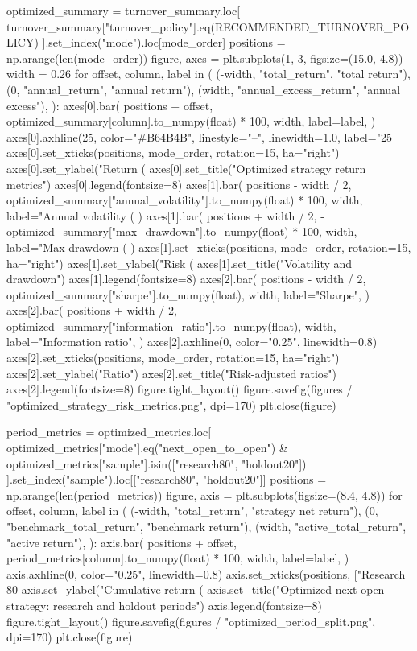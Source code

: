 \documentclass[UTF8,a4paper,fontset=fandol]{ctexart}
\begin{document}
\begin{ProjectCode}
    optimized_summary = turnover_summary.loc[
        turnover_summary["turnover_policy"].eq(RECOMMENDED_TURNOVER_POLICY)
    ].set_index("mode").loc[mode_order]
    positions = np.arange(len(mode_order))
    figure, axes = plt.subplots(1, 3, figsize=(15.0, 4.8))
    width = 0.26
    for offset, column, label in (
        (-width, "total_return", "total return"),
        (0, "annual_return", "annual return"),
        (width, "annual_excess_return", "annual excess"),
    ):
        axes[0].bar(
            positions + offset,
            optimized_summary[column].to_numpy(float) * 100,
            width,
            label=label,
        )
    axes[0].axhline(25, color="#B64B4B", linestyle="--", linewidth=1.0, label="25%
    axes[0].set_xticks(positions, mode_order, rotation=15, ha="right")
    axes[0].set_ylabel("Return (%
    axes[0].set_title("Optimized strategy return metrics")
    axes[0].legend(fontsize=8)
    axes[1].bar(
        positions - width / 2,
        optimized_summary["annual_volatility"].to_numpy(float) * 100,
        width,
        label="Annual volatility (%
    )
    axes[1].bar(
        positions + width / 2,
        -optimized_summary["max_drawdown"].to_numpy(float) * 100,
        width,
        label="Max drawdown (%
    )
    axes[1].set_xticks(positions, mode_order, rotation=15, ha="right")
    axes[1].set_ylabel("Risk (%
    axes[1].set_title("Volatility and drawdown")
    axes[1].legend(fontsize=8)
    axes[2].bar(
        positions - width / 2,
        optimized_summary["sharpe"].to_numpy(float),
        width,
        label="Sharpe",
    )
    axes[2].bar(
        positions + width / 2,
        optimized_summary["information_ratio"].to_numpy(float),
        width,
        label="Information ratio",
    )
    axes[2].axhline(0, color="0.25", linewidth=0.8)
    axes[2].set_xticks(positions, mode_order, rotation=15, ha="right")
    axes[2].set_ylabel("Ratio")
    axes[2].set_title("Risk-adjusted ratios")
    axes[2].legend(fontsize=8)
    figure.tight_layout()
    figure.savefig(figures / "optimized_strategy_risk_metrics.png", dpi=170)
    plt.close(figure)

    period_metrics = optimized_metrics.loc[
        optimized_metrics["mode"].eq("next_open_to_open")
        & optimized_metrics["sample"].isin(["research80", "holdout20"])
    ].set_index("sample").loc[["research80", "holdout20"]]
    positions = np.arange(len(period_metrics))
    figure, axis = plt.subplots(figsize=(8.4, 4.8))
    for offset, column, label in (
        (-width, "total_return", "strategy net return"),
        (0, "benchmark_total_return", "benchmark return"),
        (width, "active_total_return", "active return"),
    ):
        axis.bar(
            positions + offset,
            period_metrics[column].to_numpy(float) * 100,
            width,
            label=label,
        )
    axis.axhline(0, color="0.25", linewidth=0.8)
    axis.set_xticks(positions, ["Research 80%
    axis.set_ylabel("Cumulative return (%
    axis.set_title("Optimized next-open strategy: research and holdout periods")
    axis.legend(fontsize=8)
    figure.tight_layout()
    figure.savefig(figures / "optimized_period_split.png", dpi=170)
    plt.close(figure)



\end{ProjectCode}
\end{document}
